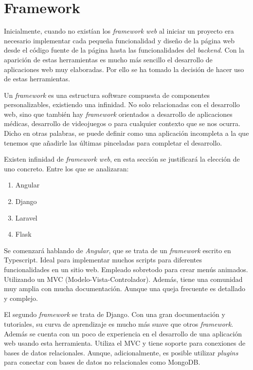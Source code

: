 \section{Framework}
Inicialmente, cuando no existían los \emph{framework web} al iniciar un proyecto era necesario implementar cada pequeña funcionalidad y diseño de la página web desde el código fuente de la página hasta las funcionalidades del \emph{backend}. Con la aparición de estas herramientas es mucho más sencillo el desarrollo de aplicaciones web muy elaboradas. Por ello se ha tomado la decisión de hacer uso de estas herramientas.

Un \emph{framework} es una estructura software compuesta de componentes personalizables, existiendo una infinidad. No solo relacionadas con el desarrollo web, sino que también hay \emph{framework} orientados a desarrollo de aplicaciones médicas, desarrollo de videojuegos o para cualquier contexto que se nos ocurra. Dicho en otras palabras, se puede definir como una aplicación incompleta a la que tenemos que añadirle las últimas pinceladas para completar el desarrollo. 

Existen infinidad de \emph{framework web}, en esta sección se justificará la elección de uno concreto. Entre los que se analizaran: 
\begin{enumerate}
    \item Angular
    \item Django
    \item Laravel
    \item Flask
\end{enumerate}

Se comenzará hablando de \emph{Angular}, que se trata de un \emph{framework} escrito en Typescript. Ideal para implementar muchos scripts para diferentes funcionalidades en un sitio web. Empleado sobretodo para crear menús animados. Utilizando un MVC (Modelo-Vista-Controlador). Además, tiene una comunidad muy amplia con mucha documentación. Aunque una queja frecuente es detallado y complejo. 

El segundo \emph{framework} se trata de Django. Con una gran documentación y tutoriales, su curva de aprendizaje es mucho más suave que otros \emph{framework}. Además se cuenta con un poco de experiencia en el desarrollo de una aplicación web usando esta herramienta. Utiliza el MVC y tiene soporte para conexiones de bases de datos relacionales. Aunque, adicionalmente, es posible utilizar \emph{plugins} para conectar con bases de datos no relacionales como MongoDB.

